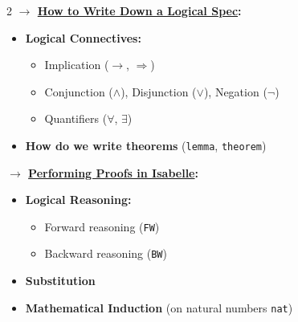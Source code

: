 \documentclass[10pt,a4paper]{article}
\begin{document}
\begin{tcolorbox}[title={2. Logical Specifications \& Isabelle Proof Overview}]
\begin{multicols}{2}
\textbf{$\rightarrow$ \underline{How to Write Down a Logical Spec}:}
\begin{itemize}[leftmargin=1.2em, itemsep=3pt]
    \item \textbf{Logical Connectives:}
    \begin{itemize}[leftmargin=1em, itemsep=1pt]
        \item Implication ($\longrightarrow$, $\Longrightarrow$)
        \item Conjunction ($\land$), Disjunction ($\lor$), Negation ($\neg$)
        \item Quantifiers ($\forall$, $\exists$)
    \end{itemize}
    \item \textbf{How do we write theorems} (\texttt{lemma}, \texttt{theorem})
\end{itemize}

\columnbreak

\textbf{$\rightarrow$ \underline{Performing Proofs in Isabelle}:}
\begin{itemize}[leftmargin=1.2em, itemsep=3pt]
    \item \textbf{Logical Reasoning:}
    \begin{itemize}[leftmargin=1em, itemsep=1pt]
        \item Forward reasoning (\texttt{FW})
        \item Backward reasoning (\texttt{BW})
    \end{itemize}
    \item \textbf{Substitution}
    \item \textbf{Mathematical Induction} (on natural numbers \texttt{nat})
\end{itemize}
\end{multicols}
\end{tcolorbox}
\end{document}
